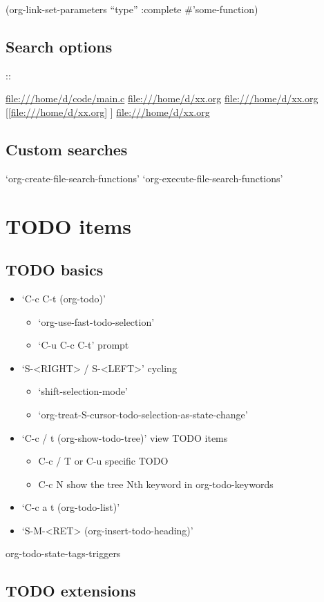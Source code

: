 \documentclass[11pt]{article}
\begin{document}
(org-link-set-parameters ``type'' :complete \#'some-function)
\subsection{Search options}
\label{sec:org3d7e429}
:: 

\url{file:///home/d/code/main.c}
\url{file:///home/d/xx.org}
\url{file:///home/d/xx.org}
[[\url{file:///home/d/xx.org}] ]
\url{file:///home/d/xx.org}
\url{}
\subsection{Custom searches}
\label{sec:org965afd2}
‘org-create-file-search-functions’
‘org-execute-file-search-functions’
\section{{\bfseries\sffamily TODO} items}
\label{sec:orgd4ca0b2}
\subsection{{\bfseries\sffamily TODO} basics}
\label{sec:org4102bb4}
\begin{itemize}
\item ‘C-c C-t     (org-todo)’
\begin{itemize}
\item ‘org-use-fast-todo-selection’
\item ‘C-u C-c C-t’ prompt
\end{itemize}
\item ‘S-<RIGHT>  /  S-<LEFT>’ cycling
\begin{itemize}
\item ‘shift-selection-mode’
\item ‘org-treat-S-cursor-todo-selection-as-state-change’
\end{itemize}
\item ‘C-c / t     (org-show-todo-tree)’  view TODO items
\begin{itemize}
\item C-c / T or C-u  specific TODO
\item C-c N   show the tree Nth keyword in org-todo-keywords
\end{itemize}
\item ‘C-c a t     (org-todo-list)’
\item ‘S-M-<RET>     (org-insert-todo-heading)’
\end{itemize}
org-todo-state-tags-triggers
\subsection{{\bfseries\sffamily TODO} extensions}
\label{sec:orgdc9d6f4}
\end{document}
